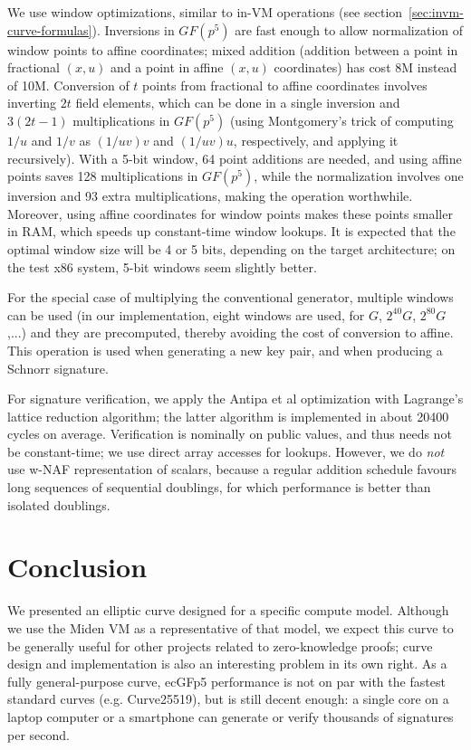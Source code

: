 \documentclass{llncs}
\newcommand{\GF}{GF}
\begin{document}
We use window optimizations, similar to in-VM operations (see
section~\ref{sec:invm-curve-formulas}). Inversions in $\GF(p^5)$ are
fast enough to allow normalization of window points to affine
coordinates; mixed addition (addition between a point in fractional $(x,
u)$ and a point in affine $(x, u)$ coordinates) has cost 8M instead of
10M. Conversion of $t$ points from fractional to affine coordinates
involves inverting $2t$ field elements, which can be done in a single
inversion and $3(2t-1)$ multiplications in $\GF(p^5)$ (using
Montgomery's trick of computing $1/u$ and $1/v$ as $(1/uv)v$ and
$(1/uv)u$, respectively, and applying it recursively). With a 5-bit
window, 64 point additions are needed, and using affine points saves 128
multiplications in $\GF(p^5)$, while the normalization involves one
inversion and 93 extra multiplications, making the operation worthwhile.
Moreover, using affine coordinates for window points makes these points
smaller in RAM, which speeds up constant-time window lookups. It is
expected that the optimal window size will be 4 or 5 bits, depending
on the target architecture; on the test x86 system, 5-bit windows seem
slightly better.

For the special case of multiplying the conventional generator, multiple
windows can be used (in our implementation, eight windows are used, for
$G$, $2^{40} G$, $2^{80} G$,...) and they are precomputed, thereby
avoiding the cost of conversion to affine. This operation is used when
generating a new key pair, and when producing a Schnorr signature.

For signature verification, we apply the Antipa et al
optimization\cite{AntBroGalLamStrVan2005} with Lagrange's lattice
reduction algorithm\cite{Por2020-2}; the latter algorithm is implemented
in about 20400 cycles on average. Verification is nominally on public
values, and thus needs not be constant-time; we use direct array
accesses for lookups. However, we do \emph{not} use w-NAF representation
of scalars, because a regular addition schedule favours long sequences
of sequential doublings, for which performance is better than isolated
doublings.

\section{Conclusion}

We presented an elliptic curve designed for a specific compute model.
Although we use the Miden VM as a representative of that model, we
expect this curve to be generally useful for other projects related to
zero-knowledge proofs; curve design and implementation is also an
interesting problem in its own right. As a fully general-purpose curve,
ecGFp5 performance is not on par with the fastest standard curves (e.g.
Curve25519), but is still decent enough: a single core on a laptop
computer or a smartphone can generate or verify thousands of signatures
per second.
\end{document}
